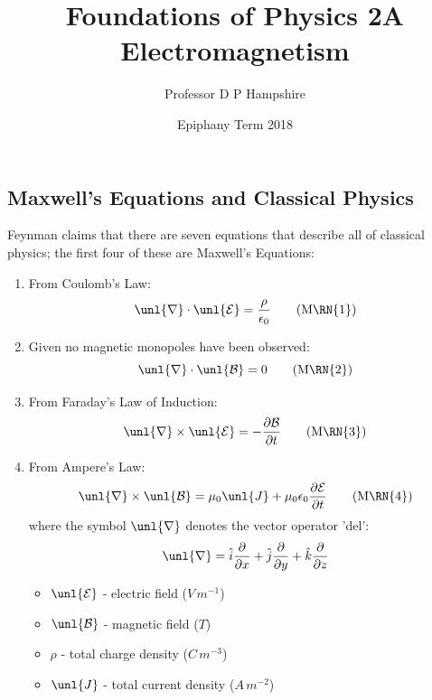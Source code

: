 \documentclass[a4paper, 11pt, normalem]{report}
\title{Foundations of Physics 2A \\ Electromagnetism \vspace{-20pt}}
\author{Professor D P Hampshire}
\date{\vspace{-15pt}Epiphany Term 2018}
\newcommand\p{\partial}
\newcommand\E{\mathcal{E}}
\newcommand\uE{\unl{\E}}
\newcommand\B{\mathcal{B}}
\newcommand\uB{\unl{\B}}
\newcommand\del{\unl{\nabla}}
\newcommand\eno{\epsilon_0}
\newcommand\hi{\hat{i}}
\newcommand\hj{\hat{j}}
\newcommand\hk{\hat{k}}
\begin{document}
\maketitle
\tableofcontents

\chapter{}

\section{Maxwell's Equations and Classical Physics}
Feynman claims that there are seven equations that describe all of classical physics; the first four of these are Maxwell's Equations:
\begin{enumerate}
    \item From Coulomb's Law:
        \begin{equation}
            \del\cdot\uE = \frac{\rho}{\epsilon_0} \tag{M\RN{1}}
        \end{equation}
    \item Given no magnetic monopoles have been observed:
        \begin{equation}
            \del\cdot \uB = 0 \tag{M\RN{2}}
        \end{equation}
    \item From Faraday's Law of Induction:
        \begin{equation}
            \del \times \uE = -\frac{\p \B}{\p t} \tag{M\RN{3}}
        \end{equation}
    \item From Ampere's Law:
        \begin{equation}
            \del \times \uB = \mu_0 \unl{J} + \mu_0 \eno \frac{\p \E}{\p t} \tag{M\RN{4}}
        \end{equation}
        where the symbol $\del$ denotes the vector operator 'del':
        \begin{equation*}
            \del = \hi \frac{\p}{\p x} + \hj \frac{\p}{\p y} + \hk \frac{\p}{\p z}
        \end{equation*}
        \begin{itemize}
            \item $\uE$ - electric field ($V\,m^{-1}$)
            \item $\uB$ - magnetic field ($T$)
            \item $\rho$ - total charge density ($C\,m^{-3}$)
            \item $\unl{J}$ - total current density ($A\,m^{-2}$)

\end{itemize}
\end{enumerate}
\end{document}
